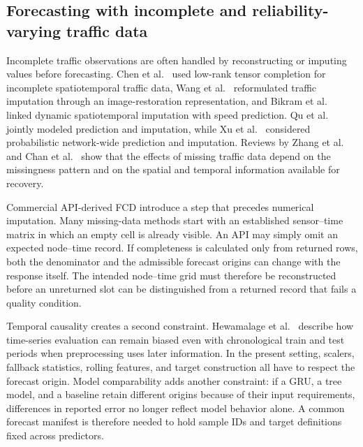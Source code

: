 \documentclass[pdflatex,sn-basic,Numbered]{sn-jnl}
\begin{document}
\subsection{Forecasting with incomplete and reliability-varying traffic data}
\label{subsec:reliability-related}

Incomplete traffic observations are often handled by reconstructing or imputing values before forecasting. Chen et al.~\cite{Chen2024TrafficCompletion} used low-rank tensor completion for incomplete spatiotemporal traffic data, Wang et al.~\cite{Wang2024RoadNetworkPixelization} reformulated traffic imputation through an image-restoration representation, and Bikram et al.~\cite{Bikram2024Imputation} linked dynamic spatiotemporal imputation with speed prediction. Qu et al.~\cite{Qu2024TrafficPredictionImputation} jointly modeled prediction and imputation, while Xu et al.~\cite{Xu2023AGNP} considered probabilistic network-wide prediction and imputation. Reviews by Zhang et al.~\cite{Zhang2024MissingData} and Chan et al.~\cite{Chan2023MissingTrafficData} show that the effects of missing traffic data depend on the missingness pattern and on the spatial and temporal information available for recovery.

Commercial API-derived FCD introduce a step that precedes numerical imputation. Many missing-data methods start with an established sensor--time matrix in which an empty cell is already visible. An API may simply omit an expected node--time record. If completeness is calculated only from returned rows, both the denominator and the admissible forecast origins can change with the response itself. The intended node--time grid must therefore be reconstructed before an unreturned slot can be distinguished from a returned record that fails a quality condition.

Temporal causality creates a second constraint. Hewamalage et al.~\cite{Hewamalage2023ForecastEvaluation} describe how time-series evaluation can remain biased even with chronological train and test periods when preprocessing uses later information. In the present setting, scalers, fallback statistics, rolling features, and target construction all have to respect the forecast origin. Model comparability adds another constraint: if a GRU, a tree model, and a baseline retain different origins because of their input requirements, differences in reported error no longer reflect model behavior alone. A common forecast manifest is therefore needed to hold sample IDs and target definitions fixed across predictors.
\end{document}
